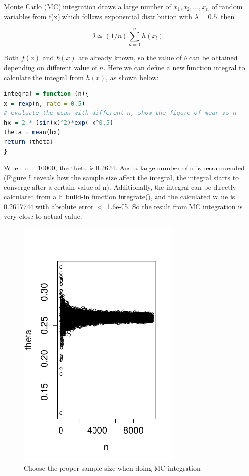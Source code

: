 \documentclass[10pt, letterpaper]{proc}
\begin{document}
Monte Carlo (MC) integration draws a large number of $x_1, x_2, ..., x_n $ of random variables from f(x) which follows exponential distribution with $\lambda = 0.5 $, then

\begin{equation}
\theta \simeq (1/n)\sum_{n=1}^{n} h(x_i)
\end{equation}

Both $f(x)$ and $h(x)$ are already known, so the value of $\theta$ can be obtained depending on different value of $n$. Here we can define a new function integral to calculate the integral from $h(x)$, as shown below:

\begin{lstlisting}[language=R, breaklines=T, basicstyle=\footnotesize\ttfamily]
integral = function (n){
x = rexp(n, rate = 0.5)
# evaluate the mean with different n, show the figure of mean vs n
hx = 2 * (sin(x)^2)*exp(-x^0.5)
theta = mean(hx)
return (theta)
}
\end{lstlisting}
When n = 10000, the theta is 0.2624. And a large number of n is recommended (Figure 5 reveals how the sample size affect the integral, the integral starts to converge after a certain value of n). Additionally, the integral can be directly calculated from a R build-in function integrate(), and the calculated value is 0.2617744 with absolute error $<$ 1.6e-05. So the result from MC integration is very close to actual value.

\begin{figure}[h]
	\centering \includegraphics[width=8cm]{theta}
	\caption{Choose the proper sample size when doing MC integration}
\end{figure}
\end{document}
